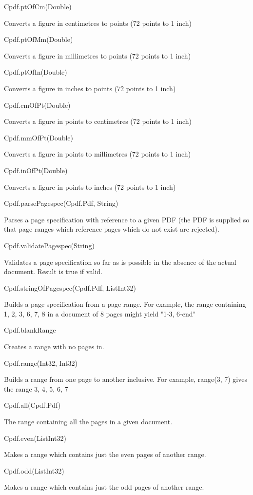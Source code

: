 Cpdf.ptOfCm(Double)


Converts a figure in centimetres to points (72 points to 1 inch)


Cpdf.ptOfMm(Double)


Converts a figure in millimetres to points (72 points to 1 inch)


Cpdf.ptOfIn(Double)


Converts a figure in inches to points (72 points to 1 inch)


Cpdf.cmOfPt(Double)


Converts a figure in points to centimetres (72 points to 1 inch)


Cpdf.mmOfPt(Double)


Converts a figure in points to millimetres (72 points to 1 inch)


Cpdf.inOfPt(Double)


Converts a figure in points to inches (72 points to 1 inch)


Cpdf.parsePagespec(Cpdf.Pdf, String)


Parses a page specification with reference
to a given PDF (the PDF is supplied so that page ranges which reference
pages which do not exist are rejected).


Cpdf.validatePagespec(String)


Validates a page specification so far as is
possible in the absence of the actual document. Result is true if valid.


Cpdf.stringOfPagespec(Cpdf.Pdf, List{Int32})


Builds a page specification from a page
range. For example, the range containing 1, 2, 3, 6, 7, 8 in a document of 8
pages might yield "1-3, 6-end"


Cpdf.blankRange


Creates a range with no pages in.


Cpdf.range(Int32, Int32)


Builds a range from one page to another inclusive. For
example, range(3, 7) gives the range 3, 4, 5, 6, 7


Cpdf.all(Cpdf.Pdf)


The range containing all the pages in a given document.


Cpdf.even(List{Int32})


Makes a range which contains just the even pages of
another range.


Cpdf.odd(List{Int32})


Makes a range which contains just the odd pages of another
range.


